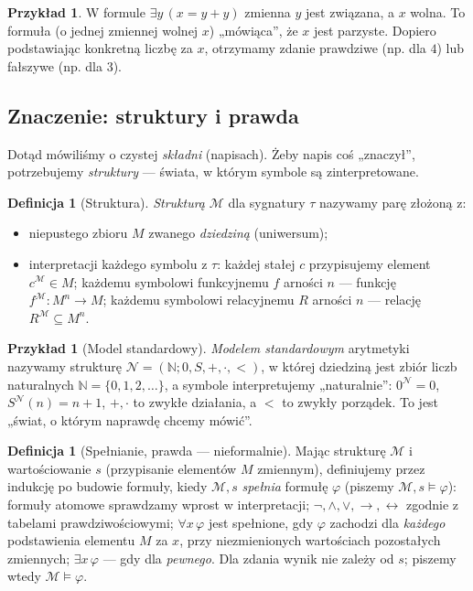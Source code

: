 \documentclass[11pt,a4paper]{article}
\numberwithin{equation}{section}
\theoremstyle{plain}
\theoremstyle{definition}
\newtheorem{definicja}[twierdzenie]{Definicja}
\newtheorem{przyklad}[twierdzenie]{Przykład}
\theoremstyle{remark}
\begin{document}
\begin{przyklad}\label{res:2:12}
W formule $\exists y\,(x=y+y)$ zmienna $y$ jest związana, a $x$ wolna. To formuła (o jednej zmiennej wolnej $x$) „mówiąca”, że $x$ jest parzyste. Dopiero podstawiając konkretną liczbę za $x$, otrzymamy zdanie prawdziwe (np. dla $4$) lub fałszywe (np. dla $3$).
\end{przyklad}

\subsection*{Znaczenie: struktury i prawda}\label{sec:struktury-prawda}
Dotąd mówiliśmy o czystej \emph{składni} (napisach). Żeby napis coś „znaczył”, potrzebujemy \emph{struktury} --- świata, w którym symbole są zinterpretowane.

\begin{definicja}[Struktura]\label{res:2:13}
\emph{Strukturą} $\mathcal M$ dla sygnatury $\tau$ nazywamy parę złożoną z:
\begin{itemize}
\item niepustego zbioru $M$ zwanego \emph{dziedziną} (uniwersum);
\item interpretacji każdego symbolu z $\tau$: każdej stałej $c$ przypisujemy element $c^{\mathcal M}\in M$; każdemu symbolowi funkcyjnemu $f$ arności $n$ --- funkcję $f^{\mathcal M}:M^n\to M$; każdemu symbolowi relacyjnemu $R$ arności $n$ --- relację $R^{\mathcal M}\subseteq M^n$.
\end{itemize}
\end{definicja}

\begin{przyklad}[Model standardowy]\label{res:2:14}
\emph{Modelem standardowym} arytmetyki nazywamy strukturę $\mathcal N=(\mathbb N;0,S,+,\cdot,<)$, w której dziedziną jest zbiór liczb naturalnych $\mathbb N=\{0,1,2,\ldots\}$, a symbole interpretujemy „naturalnie”: $0^{\mathcal N}=0$, $S^{\mathcal N}(n)=n+1$, $+,\cdot$ to zwykłe działania, a $<$ to zwykły porządek. To jest „świat, o którym naprawdę chcemy mówić”.
\end{przyklad}

\begin{definicja}[Spełnianie, prawda --- nieformalnie]\label{res:2:15}
Mając strukturę $\mathcal M$ i wartościowanie $s$ (przypisanie elementów $M$ zmiennym), definiujemy przez indukcję po budowie formuły, kiedy $\mathcal M,s$ \emph{spełnia} formułę $\varphi$ (piszemy $\mathcal M,s\models\varphi$): formuły atomowe sprawdzamy wprost w interpretacji; $\neg,\land,\lor,\to,\leftrightarrow$ zgodnie z tabelami prawdziwościowymi; $\forall x\,\varphi$ jest spełnione, gdy $\varphi$ zachodzi dla \emph{każdego} podstawienia elementu $M$ za $x$, przy niezmienionych wartościach pozostałych zmiennych; $\exists x\,\varphi$ --- gdy dla \emph{pewnego}. Dla zdania wynik nie zależy od $s$; piszemy wtedy $\mathcal M\models\varphi$.
\end{definicja}
\end{document}
